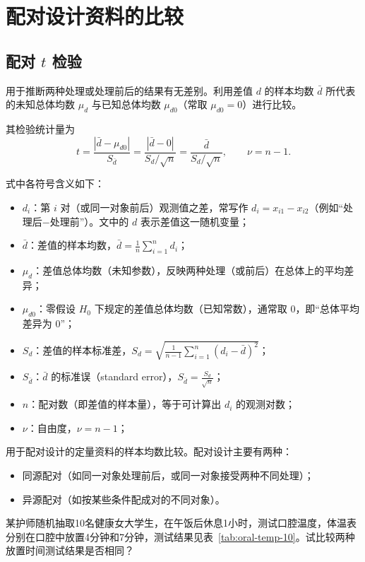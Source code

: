 \documentclass[lang=cn,10pt]{elegantbook}
\begin{document}
\section{配对设计资料的比较}

\subsection{配对 $t$ 检验}

用于推断两种处理或处理前后的结果有无差别。利用差值 $d$ 的样本均数 $\bar{d}$
所代表的未知总体均数 $\mu_d$ 与已知总体均数 $\mu_{d0}$（常取 $\mu_{d0}=0$）进行比较。

其检验统计量为
\begin{equation}
  t = \frac{\left|\bar{d}-\mu_{d0}\right|}{S_{\bar{d}}} = \frac{\left|\bar{d}-0\right|}{S_d/\sqrt{n}} = \frac{\bar{d}}{S_d/\sqrt{n}}, \qquad \nu = n-1.
\end{equation}

式中各符号含义如下：
\begin{itemize}
  \item $d_i$：第 $i$ 对（或同一对象前后）观测值之差，常写作 $d_i=x_{i1}-x_{i2}$（例如“处理后$-$处理前”）。文中的 $d$ 表示差值这一随机变量；
  \item $\bar d$：差值的样本均数，$\bar d=\frac{1}{n}\sum_{i=1}^{n} d_i$；
  \item $\mu_d$：差值总体均数（未知参数），反映两种处理（或前后）在总体上的平均差异；
  \item $\mu_{d0}$：零假设 $H_0$ 下规定的差值总体均数（已知常数），通常取 $0$，即“总体平均差异为 0”；
  \item $S_d$：差值的样本标准差，$S_d=\sqrt{\frac{1}{n-1}\sum_{i=1}^{n}(d_i-\bar d)^2}$；
  \item $S_{\bar d}$：$\bar d$ 的标准误（standard error），$S_{\bar d}=\frac{S_d}{\sqrt{n}}$；
  \item $n$：配对数（即差值的样本量），等于可计算出 $d_i$ 的观测对数；
  \item $\nu$：自由度，$\nu=n-1$；
\end{itemize}

用于配对设计的定量资料的样本均数比较。配对设计主要有两种：
\begin{itemize}
  \item 同源配对（如同一对象处理前后，或同一对象接受两种不同处理）；
  \item 异源配对（如按某些条件配成对的不同对象）。
\end{itemize}

\vspace{0.2cm}
\begin{exercise}
    某护师随机抽取10名健康女大学生，在午饭后休息1小时，测试口腔温度，体温表分别在口腔中放置4分钟和7分钟，测试结果见表~\ref{tab:oral-temp-10}。试比较两种放置时间测试结果是否相同？
\end{exercise}
\end{document}
